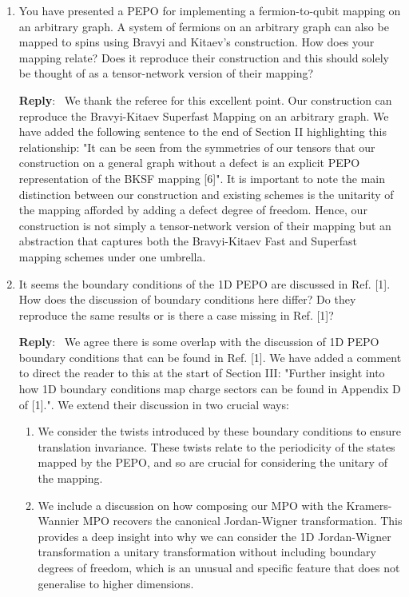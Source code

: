 \documentclass[aps,prx,floatfix,10pt,amssymb,amsfont,amsmath,superscriptaddress,float,nofootinbib,longbibliography,nobalancelastpage]{revtex4-2}
\newenvironment{reply}
   {\medskip \noindent \begin{sf}\textbf{Reply}:\ \color{blue}  }
   {\medskip \end{sf}}
\begin{document}
\begin{enumerate}

\item You have presented a PEPO for implementing a fermion-to-qubit mapping on an arbitrary graph. A system of fermions on an arbitrary graph can also be mapped to spins using Bravyi and Kitaev’s construction. How does your mapping relate? Does it reproduce their
construction and this should solely be thought of as a tensor-network version of their mapping?

\begin{reply}
    We thank the referee for this excellent point. Our construction can reproduce the Bravyi-Kitaev Superfast Mapping on an arbitrary graph. We have added the following sentence to the end of Section II highlighting this relationship: "It can be seen from the symmetries of our tensors that our construction on a general graph without a defect is an explicit PEPO representation of the BKSF mapping [6]". It is important to note the main distinction between our construction and existing schemes is the unitarity of the mapping afforded by adding a defect degree of freedom. Hence, our construction is not simply a tensor-network version of their mapping but an abstraction that captures both the Bravyi-Kitaev Fast and Superfast mapping schemes under one umbrella.
\end{reply}

\item It seems the boundary conditions of the 1D PEPO are discussed in Ref. [1]. How does the discussion of boundary conditions here differ? Do they reproduce the same results or is there
a case missing in Ref. [1]?

\begin{reply}
    We agree there is some overlap with the discussion of 1D PEPO boundary conditions that can be found in Ref. [1]. We have added a comment to direct the reader to this at the start of Section III: "Further insight into how 1D boundary conditions map charge sectors can be found in Appendix D of [1].". We extend their discussion in two crucial ways:
    \begin{enumerate}
        \item We consider the twists introduced by these boundary conditions to ensure translation invariance. These twists relate to the periodicity of the states mapped by the PEPO, and so are crucial for considering the unitary of the mapping.
        \item We include a discussion on how composing our MPO with the Kramers-Wannier MPO recovers the canonical Jordan-Wigner transformation. This provides a deep insight into why we can consider the 1D Jordan-Wigner transformation a unitary transformation without including boundary degrees of freedom, which is an unusual and specific feature that does not generalise to higher dimensions. 
    \end{enumerate}


\end{reply}
\end{enumerate}
\end{document}
